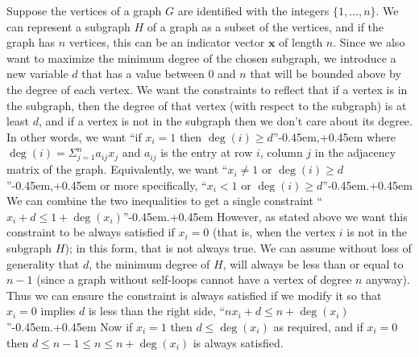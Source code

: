 Suppose the vertices of a graph $G$ are identified with the integers $\{1, \dotsc, n\}$.
We can represent a subgraph $H$ of a graph as a subset of the vertices, and if the graph has $n$ vertices, this can be an indicator vector $\mathbf{x}$ of length $n$.
Since we also want to maximize the minimum degree of the chosen subgraph, we introduce a new variable $d$ that has a value between $0$ and $n$ that will be bounded above by the degree of each vertex.
We want the constraints to reflect that if a vertex is in the subgraph, then the degree of that vertex (with respect to the subgraph) is at least $d$, and if a vertex is not in the subgraph then we don't care about its degree.
In other words, we want ``if $x_i = 1$ then $\deg(i) \geq d$''\kern-0.45em,\kern+0.45em where $\deg(i) = \Sigma_{j = 1}^n a_{ij} x_j$ and $a_{ij}$ is the entry at row $i$, column $j$ in the adjacency matrix of the graph.
Equivalently, we want ``$x_i \neq 1$ or $\deg(i) \geq d$''\kern-0.45em,\kern+0.45em or more specifically, ``$x_i < 1$ or $\deg(i) \geq d$''\kern-0.45em.\kern+0.45em
We can combine the two inequalities to get a single constraint ``$x_i + d \leq 1 + \deg(x_i)$''\kern-0.45em.\kern+0.45em
However, as stated above we want this constraint to be always satisfied if $x_i = 0$ (that is, when the vertex $i$ is not in the subgraph $H$); in this form, that is not always true.
We can assume without loss of generality that $d$, the minimum degree of $H$, will always be less than or equal to $n - 1$ (since a graph without self-loops cannot have a vertex of degree $n$ anyway).
Thus we can ensure the constraint is always satisfied if we modify it so that $x_i = 0$ implies $d$ is less than the right side, ``$n x_i + d \leq n + \deg(x_i)$''\kern-0.45em.\kern+0.45em
Now if $x_i = 1$ then $d \leq \deg(x_i)$ as required, and if $x_i = 0$ then $d \leq n- 1 \leq n \leq n + \deg(x_i)$ is always satisfied.

